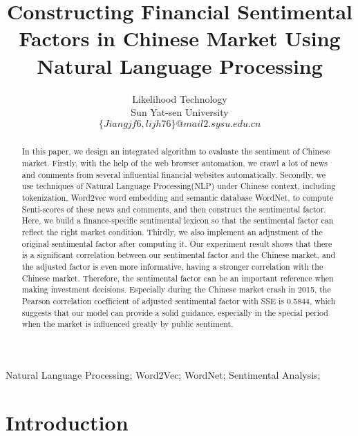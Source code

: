 \documentclass[10pt, conference, compsocconf]{IEEEtran}
\begin{document}
\title{Constructing Financial Sentimental Factors in Chinese Market Using Natural Language Processing}
\author
{
\IEEEauthorblockA
{
Likelihood Technology\\
}
\IEEEauthorblockA
{
Sun Yat-sen University\\
}
$ $\\
$\{Jiangjf6,lijh76\}@mail2.sysu.edu.cn$
}

\maketitle
\begin{abstract}

In this paper, we design an integrated algorithm to evaluate the sentiment of Chinese market. Firstly, with the help of the web browser automation, we crawl a lot of news and comments from several influential financial websites automatically. Secondly, we use techniques of Natural Language Processing(NLP) under Chinese context, including tokenization, Word2vec word embedding and semantic database WordNet, to compute Senti-scores of these news and comments, and then construct the sentimental factor. Here, we build a finance-specific sentimental lexicon so that the sentimental factor can reflect the right market condition. Thirdly, we also implement an adjustment of the original sentimental factor after computing it. Our experiment result shows that there is a significant correlation between our sentimental factor and the Chinese market, and the adjusted factor is even more informative, having a stronger correlation with the Chinese market. Therefore, the sentimental factor can be an important reference when making investment decisions. Especially during the Chinese market crash in 2015, the Pearson correlation coefficient of adjusted sentimental factor with SSE is 0.5844, which suggests that our model can provide a solid guidance, especially in the special period when the market is influenced greatly by public sentiment.
\end{abstract}

\begin{IEEEkeywords}
Natural Language Processing; Word2Vec; WordNet; Sentimental Analysis;
\end{IEEEkeywords}

\IEEEpeerreviewmaketitle
\section{Introduction}
\end{document}
